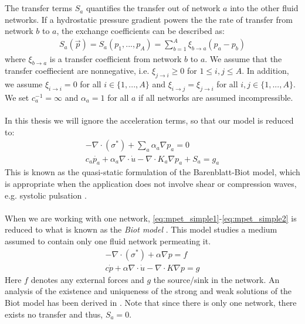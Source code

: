 \\
\\
The transfer terms $S_a$ quantifies the transfer out of network $a$ into the other fluid networks. If a hydrostatic pressure gradient powers the the rate of transfer from network $b$ to $a$, the exchange coefficients can be described as:
\begin{align}
S_a(\vec{p}) = S_a(p_1, ...,p_A) = \displaystyle\sum_{b=1}^A \xi_{b \rightarrow a}(p_a - p_b)
\end{align}
where $\xi_{b \rightarrow a}$ is a transfer coefficient from network $b$ to $a$. We assume that the transfer coeffiecient are nonnegative, i.e. $\xi_{j \to i} \geq 0$ for $1 \leq i,j \leq A$. In addition, we assume $\xi_{i \to i} = 0$ for all $i \in \{1, ..., A\}$ and $\xi_{i \to j} = \xi_{j \to i}$ for all $i,j \in \{1, ..., A\}$. We set $c_a^{-1} = \infty$ and $\alpha_a = 1 $ for all $a$ if all networks are assumed incompressible. 
\\
\\
In this thesis we will ignore the acceleration terms, so that our model is reduced to: 
\\
\begin{align} \label{eq:mpet_simple1}
- \nabla \cdot (\sigma^{\ast}) + \displaystyle\sum_a \alpha_a \nabla p_a = 0
\\
 c_a\dot{p_a} + \alpha_a \nabla \cdot\dot{u} - \nabla \cdot K_a \nabla p_a + S_a = g_a \label{eq:mpet_simple2}
\end{align}
This is known as the quasi-static formulation of the Barenblatt-Biot model, which is appropriate when the application does not involve shear or compression waves, e.g. systolic pulsation \cite{tully}. 
\\
\\
When we are working with one network, \eqref{eq:mpet_simple1}-\eqref{eq:mpet_simple2} is reduced to what is known as the  \textit{Biot model} \cite{biot}. This model studies a medium assumed to contain only one fluid network permeating it. 
\begin{align} \label{eq:biot1}
- \nabla \cdot(\sigma^{\ast}) +  \alpha \nabla p = f \\
c\dot{p} + \alpha \nabla \cdot\dot{u} - \nabla \cdot K \nabla p = g \label{eq:biot2}
\end{align}
Here $f$ denotes any external forces and $g$ the source/sink in the network. An analysis of the existence and uniqueness of the strong and weak solutions of the Biot model has been derived in \cite{showalter, zenisek}. Note that since there is only one network, there exists no transfer and thus, $S_a=0$.
